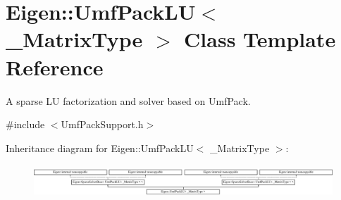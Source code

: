 \hypertarget{class_eigen_1_1_umf_pack_l_u}{}\section{Eigen\+:\+:Umf\+Pack\+LU$<$ \+\_\+\+Matrix\+Type $>$ Class Template Reference}
\label{class_eigen_1_1_umf_pack_l_u}


A sparse LU factorization and solver based on Umf\+Pack.  




{\ttfamily \#include $<$Umf\+Pack\+Support.\+h$>$}

Inheritance diagram for Eigen\+:\+:Umf\+Pack\+LU$<$ \+\_\+\+Matrix\+Type $>$\+:\begin{figure}[H]
\begin{center}
\leavevmode
\includegraphics[height=1.217391cm]{class_eigen_1_1_umf_pack_l_u}
\end{center}
\end{figure}
